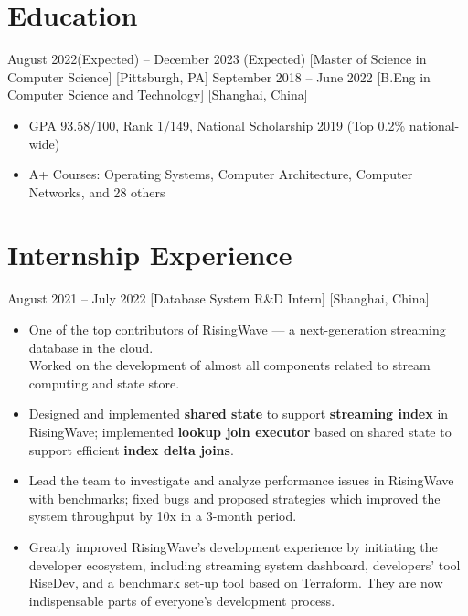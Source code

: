 \documentclass{chicv}
\begin{document}

\section{Education}
  {August 2022(Expected) -- December 2023 (Expected)}
  [Master of Science in Computer Science]
  [Pittsburgh, PA]
  {September 2018 -- June 2022}
  [B.Eng in Computer Science and Technology]
  [Shanghai, China]
  \begin{itemize}
    \item GPA 93.58/100, Rank 1/149, National Scholarship 2019 (Top 0.2\% national-wide)
    \item A+ Courses: Operating Systems, Computer Architecture, Computer Networks, and 28 others
  \end{itemize}

\section{Internship Experience}

  {August 2021 – July 2022}
  [Database System R\&D Intern]
  [Shanghai, China]

\begin{itemize}
  \item One of the top contributors of RisingWave — a next-generation streaming database in the cloud. \\ Worked on the development of almost all components related to stream computing and state store.
  \item Designed and implemented \textbf{shared state} to support \textbf{streaming index} in RisingWave; implemented \textbf{lookup join executor} based on shared state to support efficient \textbf{index delta joins}.
  \item Lead the team to investigate and analyze performance issues in RisingWave with benchmarks; fixed bugs and proposed strategies which improved the system throughput by 10x in a 3-month period.
  \item Greatly improved RisingWave’s development experience by initiating the developer ecosystem, including streaming system dashboard, developers’ tool RiseDev, and a benchmark set-up tool based on Terraform. They are now indispensable parts of everyone’s development process.
\end{itemize}
\end{document}
